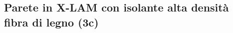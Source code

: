 \documentclass[a4paper,10pt]{report}
\begin{document}
\begin{landscape}
        \subsection*{Parete in X-LAM con isolante alta densità fibra di legno (3c)}
                \begin{minipage}[c]{0.3\linewidth}
                        
                \end{minipage}
                \hspace*{0.15\linewidth}
                \begin{minipage}[c]{0.55\linewidth}
                            
                \end{minipage}
                \clearpage       
\end{landscape}
\clearpage

\end{document}
